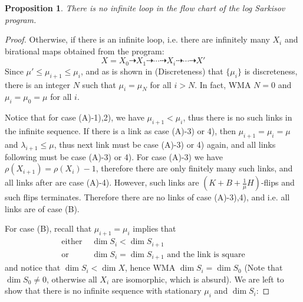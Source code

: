 \documentclass{article}
\newtheorem{prop}[defn]{Proposition}
\begin{document}
\begin{prop}
There is no infinite loop in the flow chart of the log Sarkisov program.
\end{prop}
\begin{proof}
Otherwise, if there is an infinite loop, i.e. there are infinitely many $ X_i $ and birational maps obtained from the program:
$$ X=X_0\dashrightarrow X_1\dashrightarrow \cdots\dashrightarrow X_i \dashrightarrow\cdots\dashrightarrow X'$$
Since $ \mu'\leqslant\mu_{i+1}\leqslant \mu_i $, and as is shown in (Discreteness) that $ \{\mu_i\} $ is discreteness, there is an integer $ N $ such that $ \mu_i=\mu_N $ for all $ i>N $. In fact, WMA $ N=0 $ and $ \mu_i=\mu_0=\mu $ for all $ i $. 

Notice that for case (A)-1),2), we have $ \mu_{i+1}<\mu_i $, thus there is no such links in the infinite sequence. If there is a link as case (A)-3) or 4), then $ \mu_{i+1}=\mu_i=\mu  $ and $ \lambda_{i+1}\leqslant \mu $, thus next link must be case (A)-3) or 4) again, and all links following must be case (A)-3) or 4). For case (A)-3) we have $ \rho(X_{i+1})=\rho(X_i)-1 $, therefore there are only finitely many such links, and all links after are  case (A)-4). However, such links are $ (K+B+\frac{1}{\mu}H) $-flips and such flips terminates. Therefore there are no links of case (A)-3),4), and i.e. all links are of case (B).

For case (B), recall that $ \mu_{i+1}=\mu_i $ implies that 
\begin{equation*}
\begin{aligned}
\text{either } &\dim S_i<\dim S_{i+1} \\
\text{or }&\dim S_i=\dim S_{i+1} \text{ and the link is square} 
\end{aligned}
\end{equation*} 
and notice that $ \dim S_i< \dim X $, hence WMA $ \dim S_i=\dim S_0 $ (Note that $ \dim S_0 \neq 0$, otherwise all $ X_i $ are isomorphic, which is absurd). We are left to show that there is no infinite sequence with stationary $ \mu_i $ and $ \dim S_i $:


\end{proof}
\end{document}

